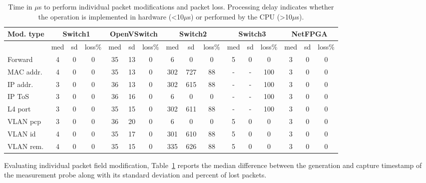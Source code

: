   \begin{table}[tb]
\begin{center}
    {%
      {\small
        \begin{tabular}[t]{ |l | c | c | c || c | c | c  || c | c | c || c | c | c || c | c | c | }
          \hline                       
          Mod. type & \multicolumn{3}{|c|}{Switch1} & \multicolumn{3}{|c|}{OpenVSwitch} &   \multicolumn{3}{|c|}{Switch2}  &   \multicolumn{3}{|c|}{Switch3} & \multicolumn{3}{|c|}{NetFPGA}\\ 
          \hline                       
          & med & sd & loss\%  & med & sd & loss\% & med & sd & loss\% & med & sd & loss\%  & med & sd & loss\% \\
          \hline  
          Forward & 4 & 0 & 0 & 35 & 13 & 0& 6 & 0 & 0 & 5 & 0 & 0 & 3 & 0 & 0 \\
          \hline  
          MAC addr. & 4 & 0 & 0 & 35 & 13 & 0& 302 & 727 & 88& - & - & 100 & 3 & 0 & 0 \\
          \hline  
          IP addr. & 3 & 0 & 0 & 36 & 13 & 0 & 302 & 615 & 88&  - & - &  100 & 3 & 0 & 0 \\
          \hline  
          IP ToS & 3 & 0 & 0 & 36 & 16 & 0 & 6 & 0 & 0 & - & - & 100 & 3 & 0 & 0 \\
          \hline  
          L4 port & 3 & 0 & 0 & 35 & 15 & 0 & 302 & 611 &  88& - & - & 100 & 3 & 0 & 0 \\
          \hline  
          VLAN pcp & 3 & 0 & 0 & 36 & 20 & 0 & 6 & 0 & 0&  5 & 0 & 0 & 3 & 0 & 0 \\
          \hline  
          VLAN id & 4 & 0 & 0 & 35 & 17 & 0 & 301 & 610 & 88& 5 & 0 & 0 & 3 & 0 & 0  \\
          \hline  
          VLAN rem. & 4 & 0 & 0 & 35 & 15 & 0 & 335 & 626 & 88&  5 & 0 & 0 & 3 & 0 & 0 \\
      \hline
    \end{tabular}}}
\caption{Time in $\mu$s to perform individual packet modifications and packet
loss. Processing delay indicates whether the operation is
  implemented in hardware (\textless10$\mu$s) or performed by the CPU (\textgreater10$\mu$s).}
  \label{tbl:feature_delay}
\end{center}
\end{table}
Evaluating individual packet field modification,
Table~\ref{tbl:feature_delay} reports the median difference between
the generation and capture timestamp of the measurement probe along
with its standard deviation and percent of lost packets.


